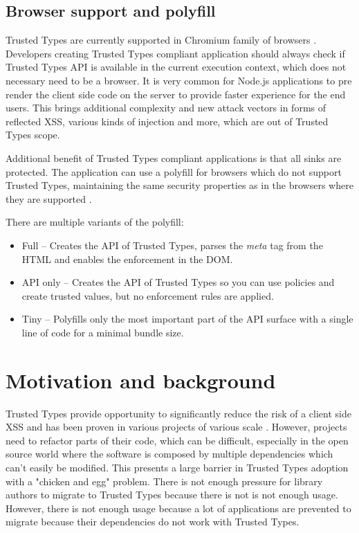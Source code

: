 \subsection{Browser support and polyfill}

Trusted Types are currently supported in Chromium family of browsers \cite{mdn:tt_compatibility}.
Developers creating Trusted Types compliant application should always check if Trusted Types API is
available in the current execution context, which does not necessary need to be a browser. It is
very common for Node.js applications to pre render the client side code on the server to provide
faster experience for the end users. This brings additional complexity and new attack vectors in
forms of reflected XSS, various kinds of injection and more, which are out of Trusted Types scope.

Additional benefit of Trusted Types compliant applications is that all sinks are protected. The
application can use a polyfill for browsers which do not support Trusted Types, maintaining the same
security properties as in the browsers where they are supported \cite{xss_nowhere_with_polyfill}.

There are multiple variants of the polyfill:

\begin{itemize}
  \item Full -- Creates the API of Trusted Types, parses the \textit{meta} tag from the HTML and
        enables the enforcement in the DOM.
  \item API only -- Creates the API of Trusted Types so you can use policies and create trusted
        values, but no enforcement rules are applied.
  \item Tiny -- Polyfills only the most important part of the API surface with a single line of code
        for a minimal bundle size.
\end{itemize}

\section{Motivation and background}

Trusted Types provide opportunity to significantly reduce the risk of a client side XSS and has been
proven in various projects of various scale \cite{tt_web_framework_paper}
\cite{tt_integration_list}. However, projects need to refactor parts of their code, which can be
difficult, especially in the open source world where the software is composed by multiple
dependencies which can't easily be modified. This presents a large barrier in Trusted Types adoption
\cite{tt_web_framework_paper} with a "chicken and egg" problem. There is not enough pressure for
library authors to migrate to Trusted Types because there is not is not enough usage. However, there
is not enough usage because a lot of applications are prevented to migrate because their
dependencies do not work with Trusted Types.

